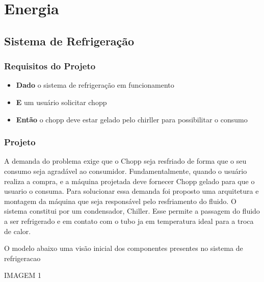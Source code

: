 \chapter[Energia]{Energia}
    \section[Sistema de Refrigeração]{Sistema de Refrigeração}
        \subsection[Requisitos do Projeto]{Requisitos do Projeto}
        
        \begin{itemize}
            \item \textbf{Dado} o sistema de refrigeração em funcionamento
            \item \textbf{E} um usuário solicitar chopp
            \item \textbf{Então} o chopp deve estar gelado pelo chirller para possibilitar o consumo
        \end{itemize}

        \subsection[Projeto]{Projeto}
            A demanda do problema exige que o Chopp seja resfriado de forma que o seu
            consumo seja agradável ao consumidor. Fundamentalmente, quando o usuário realiza
            a compra, e a máquina projetada deve fornecer Chopp gelado para que o usuario o
            consuma. Para solucionar essa demanda foi proposto uma arquitetura e montagem da
            máquina que seja responsável pelo resfriamento do fluido. O sistema constitui por um
            condensador, Chiller. Esse permite a passagem do fluido a ser refrigerado e em
            contato com o tubo ja em temperatura ideal para a troca de calor.

            O modelo abaixo uma visão inicial dos componentes presentes no sistema de
            refrigeracao

            IMAGEM 1


